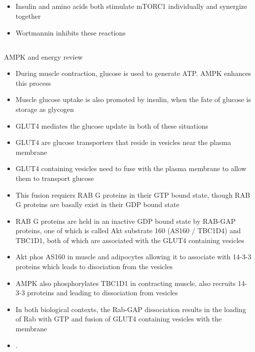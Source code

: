 \documentclass{article}
\begin{document}
    \subsection{\cite{hinalt2004amino}}
    \begin{itemize}
        \item Insulin and amino acids both stimulate mTORC1 individually and synergize together
        \item Wortmannin inhibits these reactions
    \end{itemize}

    \subsection{\cite{hardie2012ampk}}
    AMPK and energy review
    \begin{itemize}
        \item During muscle contraction, glucose is used to generate ATP. AMPK enhances this process
        \item Muscle glucose uptake is also promoted by insulin, when the fate of glucose is storage as glycogen
        \item GLUT4 mediates the glucose update in both of these situations
        \item GLUT4 are glucose transporters that reside in vesicles near the plasma membrane
        \item GLUT4 containing vesicles need to fuse with the plasma membrane to allow them to transport glucose
        \item This fusion requiers RAB G proteins in their GTP bound state, though RAB G proteins are basally exist in their GDP bound state
        \item RAB G proteins are held in an inactive GDP bound state by RAB-GAP proteins, one of which is called Akt substrate 160 (AS160 / TBC1D4) and TBC1D1, both of which are associated with the GLUT4 containing vesicles
        \item Akt phos AS160 in muscle and adipocytes allowing it to associate with 14-3-3 proteins which leads to disociation from the vesicles
        \item AMPK also phosphorylates TBC1D1 in contracting muscle, also recruits 14-3-3 prroteins and leading to dissociation from vesicles
        \item In both biological contexts, the Rab-GAP dissociation results in the loading of Rab with GTP and fusion of GLUT4 containing vesicles with the membrane
        \item .
    \end{itemize}
\end{document}

